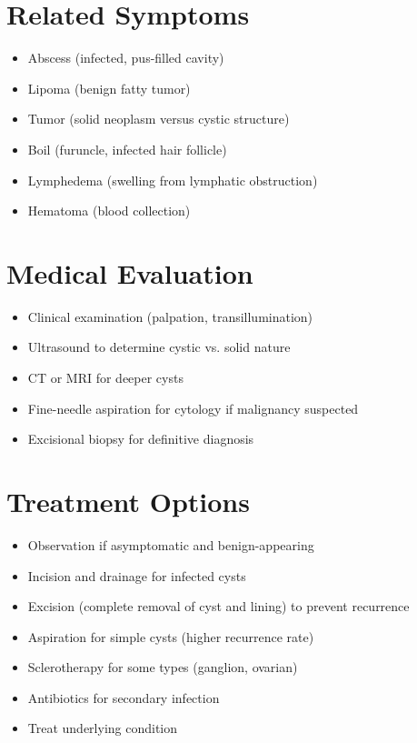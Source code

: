 \section*{Related Symptoms}
\begin{itemize}
\item Abscess (infected, pus-filled cavity)
\item Lipoma (benign fatty tumor)
\item Tumor (solid neoplasm versus cystic structure)
\item Boil (furuncle, infected hair follicle)
\item Lymphedema (swelling from lymphatic obstruction)
\item Hematoma (blood collection)
\end{itemize}

\section*{Medical Evaluation}
\begin{itemize}
\item Clinical examination (palpation, transillumination)
\item Ultrasound to determine cystic vs. solid nature
\item CT or MRI for deeper cysts
\item Fine-needle aspiration for cytology if malignancy suspected
\item Excisional biopsy for definitive diagnosis
\end{itemize}

\section*{Treatment Options}
\begin{itemize}
\item Observation if asymptomatic and benign-appearing
\item Incision and drainage for infected cysts
\item Excision (complete removal of cyst and lining) to prevent recurrence
\item Aspiration for simple cysts (higher recurrence rate)
\item Sclerotherapy for some types (ganglion, ovarian)
\item Antibiotics for secondary infection
\item Treat underlying condition
\end{itemize}
